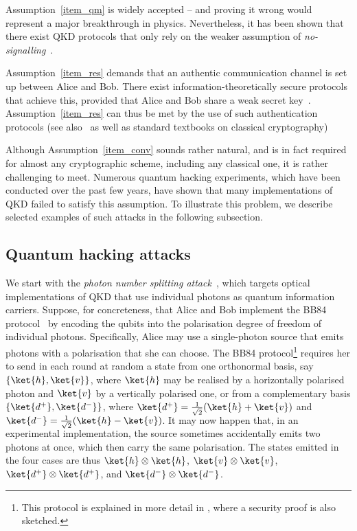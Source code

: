 Assumption~\ref{item_qm} is widely accepted \--- and proving it wrong would represent a major breakthrough in physics. Nevertheless, it has been shown that there exist QKD protocols that only rely on the weaker assumption of \emph{no-signalling}~\cite{BHK05}.  

Assumption~\ref{item_res} demands that an authentic communication channel is set up between Alice and Bob. There exist information-theoretically secure protocols that achieve this, provided that Alice and Bob share a weak secret key~\cite[see also ]{RW03,DW09,ACLV19}.  Assumption~\ref{item_res} can thus be met by the use of such authentication protocols (see also~ as well as standard textbooks on classical cryptography)

Although Assumption~\ref{item_conv} sounds rather natural, and is in fact required for almost any cryptographic scheme, including any classical one, it is rather challenging to meet.  Numerous quantum hacking experiments, which have been conducted over the past few years, have shown that many implementations of QKD failed to satisfy this assumption. To illustrate this problem, we describe selected examples of such attacks in the following subsection.

\subsection{Quantum hacking attacks} \label{sec:attacks:hacking}          

We start with the \emph{photon number splitting attack}~\cite{Brassardetal2000}, which targets optical implementations of QKD that use individual photons as quantum information carriers. Suppose, for concreteness, that Alice and Bob implement the BB84 protocol~\cite{BB84} by encoding the qubits into the polarisation degree of freedom of individual photons. Specifically, Alice may use a single-photon source that emits photons with a polarisation that she can choose. The BB84 protocol\footnote{This protocol is explained in more detail in , where a security proof is also sketched.} requires her to send in each round at random a state from one orthonormal basis, say $\{\ket{h}, \ket{v}\}$, where $\ket{h}$ may be realised by a horizontally polarised photon and $\ket{v}$ by a vertically polarised one, or from a complementary basis $\{\ket{d^+}, \ket{d^-}\}$, where $\ket{d^+} = \smash{\frac{1}{\sqrt{2}}} (\ket{h} + \ket{v})$ and $\ket{d^-} = \smash{\frac{1}{\sqrt{2}}} (\ket{h} - \ket{v})$. It may now happen that, in an experimental implementation, the source sometimes accidentally emits two photons at once, which then carry the same polarisation. The states emitted in the four cases are thus $\ket{h} \otimes \ket{h}$, $\ket{v} \otimes \ket{v}$, $\ket{d^+} \otimes \ket{d^+}$, and $\ket{d^-} \otimes \ket{d^-}$.

